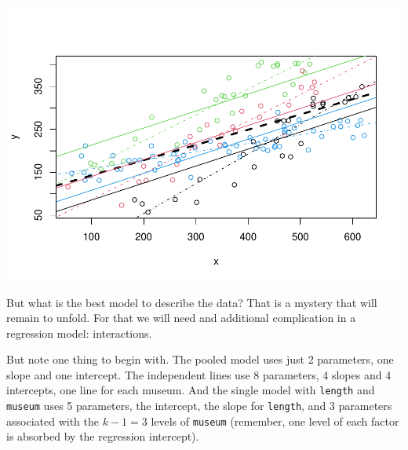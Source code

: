 \documentclass[
]{book}
\newenvironment{Shaded}{\begin{snugshade}}{\end{snugshade}}
\newcommand{\AttributeTok}[1]{\textcolor[rgb]{0.13,0.29,0.53}{#1}}
\newcommand{\DecValTok}[1]{\textcolor[rgb]{0.00,0.00,0.81}{#1}}
\newcommand{\FunctionTok}[1]{\textcolor[rgb]{0.13,0.29,0.53}{\textbf{#1}}}
\newcommand{\NormalTok}[1]{#1}
\newcommand{\SpecialCharTok}[1]{\textcolor[rgb]{0.81,0.36,0.00}{\textbf{#1}}}
\begin{document}
\begin{Shaded}
\end{Shaded}

\includegraphics{ECOMODbook_files/figure-latex/a7.16-1.pdf}

But what is the best model to describe the data? That is a mystery that will remain to unfold. For that we will need and additional complication in a regression model: interactions.

But note one thing to begin with. The pooled model uses just 2 parameters, one slope and one intercept. The independent lines use 8 parameters, 4 slopes and 4 intercepts, one line for each museum. And the single model with \texttt{length} and \texttt{museum} uses 5 parameters, the intercept, the slope for \texttt{length}, and 3 parameters associated with the \(k-1=3\) levels of \texttt{museum} (remember, one level of each factor is absorbed by the regression intercept).
\end{document}

